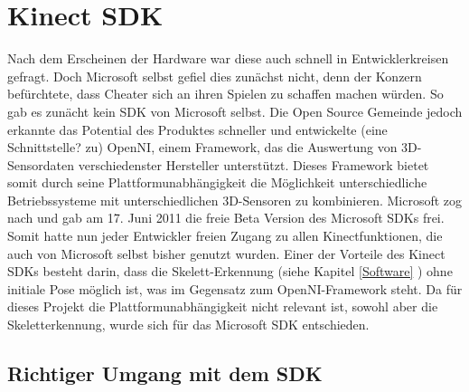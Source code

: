 \section{Kinect SDK}
Nach dem Erscheinen der Hardware war diese auch schnell in Entwicklerkreisen gefragt. Doch Microsoft selbst gefiel dies zunächst nicht, denn der Konzern befürchtete, dass Cheater sich an ihren Spielen zu schaffen machen würden.
So gab es zunächt kein SDK von Microsoft selbst. Die Open Source Gemeinde jedoch erkannte das Potential des Produktes schneller und entwickelte (eine Schnittstelle? zu) OpenNI, einem Framework, das die Auswertung von 3D-Sensordaten verschiedenster Hersteller unterstützt. Dieses Framework bietet somit durch seine Plattformunabhängigkeit die Möglichkeit unterschiedliche Betriebssysteme mit unterschiedlichen 3D-Sensoren zu kombinieren.\cite{webb2012beginning}
Microsoft zog nach und gab am 17. Juni 2011 die freie Beta Version des Microsoft SDKs frei. Somit hatte nun jeder Entwickler freien Zugang zu allen Kinectfunktionen, die auch von Microsoft selbst bisher genutzt wurden. Einer der Vorteile des Kinect SDKs besteht darin, dass die Skelett-Erkennung (siehe Kapitel \ref{Software} ) ohne initiale Pose möglich ist, was im Gegensatz zum OpenNI-Framework steht. \cite{webb2012beginning} Da für dieses Projekt die Plattformunabhängigkeit nicht relevant ist, sowohl aber die Skeletterkennung, wurde sich für das Microsoft SDK entschieden.

\subsection{Richtiger Umgang mit dem SDK}




